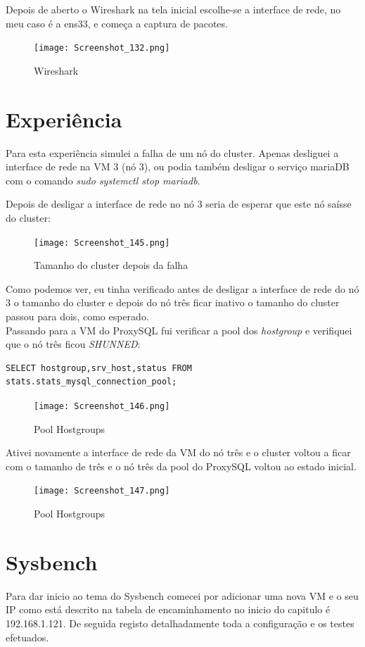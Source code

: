 Depois de aberto o Wireshark na tela inicial escolhe-se a interface de rede, no meu caso é a ens33, e começa a captura de pacotes.

\begin{figure}[H]
\center
\texttt{[image: Screenshot\_132.png]}
\caption{Wireshark}
\end{figure}

\newpage
\section{Experiência} 
Para esta experiência simulei a falha de um nó do cluster. Apenas desliguei a interface de rede na \ac{VM} 3 (nó 3), ou podia também desligar o serviço mariaDB com o comando \textit{sudo systemctl stop mariadb}.

Depois de desligar a interface de rede no nó 3 seria de esperar que este nó saísse do cluster:

\begin{figure}[H]
\center
\texttt{[image: Screenshot\_145.png]}
\caption{Tamanho do cluster depois da falha}
\end{figure}

Como podemos ver, eu tinha verificado antes de desligar a interface de rede do nó 3 o tamanho do cluster e depois do nó três ficar inativo o tamanho do cluster passou para dois, como esperado.\\
Passando para a \ac{VM} do ProxySQL fui verificar a pool dos \textit{hostgroup} e verifiquei que o nó três ficou \textit{SHUNNED}:

\begin{verbatim}SELECT hostgroup,srv_host,status FROM stats.stats_mysql_connection_pool;\end{verbatim}

\begin{figure}[H]
\center
\texttt{[image: Screenshot\_146.png]}
\caption{Pool Hostgroups}
\end{figure}

Ativei novamente a interface de rede da \ac{VM} do nó três e o cluster voltou a ficar com o tamanho de três e o nó três da pool do ProxySQL voltou ao estado inicial.

\begin{figure}[H]
\center
\texttt{[image: Screenshot\_147.png]}
\caption{Pool Hostgroups}
\end{figure}

\newpage
\section{Sysbench}
Para dar inicio ao tema do Sysbench comecei por adicionar uma nova \ac{VM} e o seu \ac{IP} como está descrito na tabela de encaminhamento no inicio do capitulo é 192.168.1.121. De seguida registo detalhadamente toda a configuração e os testes efetuados.

